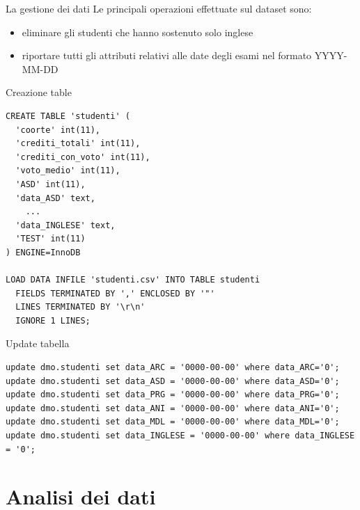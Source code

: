 \documentclass{beamer}
\begin{document}
    \begin{frame}{La gestione dei dati}
        Le principali operazioni effettuate sul dataset sono:
        \begin{itemize}
            \item eliminare gli studenti che hanno sostenuto solo inglese
            \item riportare tutti gli attributi relativi alle date degli esami nel formato YYYY-MM-DD
        \end{itemize}
    \end{frame}

\begin{frame}[fragile]{Creazione table}
\begin{lstlisting}[style=sql]
CREATE TABLE 'studenti' (
  'coorte' int(11),
  'crediti_totali' int(11),
  'crediti_con_voto' int(11),
  'voto_medio' int(11),
  'ASD' int(11),
  'data_ASD' text,
    ...
  'data_INGLESE' text,
  'TEST' int(11)
) ENGINE=InnoDB

LOAD DATA INFILE 'studenti.csv' INTO TABLE studenti
  FIELDS TERMINATED BY ',' ENCLOSED BY '"'
  LINES TERMINATED BY '\r\n'
  IGNORE 1 LINES; 
\end{lstlisting}
\end{frame}

\begin{frame}[fragile]{Update tabella}
\begin{lstlisting}[style=sql]
update dmo.studenti set data_ARC = '0000-00-00' where data_ARC='0'; 
update dmo.studenti set data_ASD = '0000-00-00' where data_ASD='0'; 
update dmo.studenti set data_PRG = '0000-00-00' where data_PRG='0'; 
update dmo.studenti set data_ANI = '0000-00-00' where data_ANI='0'; 
update dmo.studenti set data_MDL = '0000-00-00' where data_MDL='0';
update dmo.studenti set data_INGLESE = '0000-00-00' where data_INGLESE = '0';
\end{lstlisting}
\end{frame}

\section{Analisi dei dati}
\end{document}
